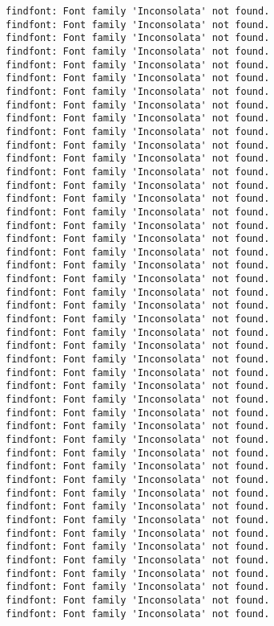 \documentclass[11pt]{article}
\begin{document}
    \begin{Verbatim}[commandchars=\\\{\}]
findfont: Font family 'Inconsolata' not found.
findfont: Font family 'Inconsolata' not found.
findfont: Font family 'Inconsolata' not found.
findfont: Font family 'Inconsolata' not found.
findfont: Font family 'Inconsolata' not found.
findfont: Font family 'Inconsolata' not found.
findfont: Font family 'Inconsolata' not found.
findfont: Font family 'Inconsolata' not found.
findfont: Font family 'Inconsolata' not found.
findfont: Font family 'Inconsolata' not found.
findfont: Font family 'Inconsolata' not found.
findfont: Font family 'Inconsolata' not found.
findfont: Font family 'Inconsolata' not found.
findfont: Font family 'Inconsolata' not found.
findfont: Font family 'Inconsolata' not found.
findfont: Font family 'Inconsolata' not found.
findfont: Font family 'Inconsolata' not found.
findfont: Font family 'Inconsolata' not found.
findfont: Font family 'Inconsolata' not found.
findfont: Font family 'Inconsolata' not found.
findfont: Font family 'Inconsolata' not found.
findfont: Font family 'Inconsolata' not found.
findfont: Font family 'Inconsolata' not found.
findfont: Font family 'Inconsolata' not found.
findfont: Font family 'Inconsolata' not found.
findfont: Font family 'Inconsolata' not found.
findfont: Font family 'Inconsolata' not found.
findfont: Font family 'Inconsolata' not found.
findfont: Font family 'Inconsolata' not found.
findfont: Font family 'Inconsolata' not found.
findfont: Font family 'Inconsolata' not found.
findfont: Font family 'Inconsolata' not found.
findfont: Font family 'Inconsolata' not found.
findfont: Font family 'Inconsolata' not found.
findfont: Font family 'Inconsolata' not found.
findfont: Font family 'Inconsolata' not found.
findfont: Font family 'Inconsolata' not found.
findfont: Font family 'Inconsolata' not found.
findfont: Font family 'Inconsolata' not found.
findfont: Font family 'Inconsolata' not found.
findfont: Font family 'Inconsolata' not found.
findfont: Font family 'Inconsolata' not found.
findfont: Font family 'Inconsolata' not found.
findfont: Font family 'Inconsolata' not found.
findfont: Font family 'Inconsolata' not found.
findfont: Font family 'Inconsolata' not found.
    \end{Verbatim}

    \begin{center}
    \end{center}
    { \hspace*{\fill} \\}
    
\end{document}
